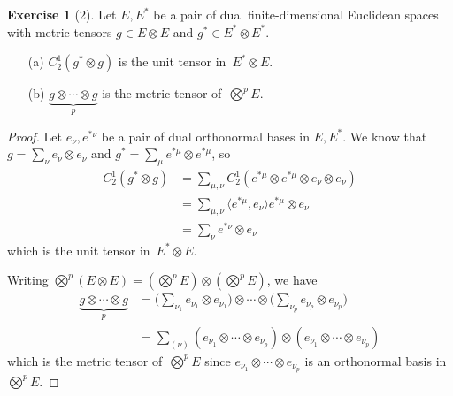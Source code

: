 \documentclass[letterpaper,12pt]{article}
\newcommand{\tprod}{\otimes}
\newcommand{\bigtprod}{\bigotimes}
\newcommand{\medtprod}{{\textstyle\bigtprod}}
\newcommand{\sprod}[2]{\langle#1,#2\rangle}
\newcommand{\multi}[4]{#2_{#3}#1\cdots#1#2_{#4}}
\newcommand{\tprods}[3]{\multi{\tprod}{#1}{#2}{#3}}
\theoremstyle{definition}
\newtheorem*{exer}{Exercise}
\theoremstyle{remark}
\begin{document}
\begin{exer}[2]
Let \(E,E^*\) be a pair of dual finite-dimensional Euclidean spaces with metric tensors \(g\in E\tprod E\) and \(g^*\in E^*\tprod E^*\).
\begin{enumerate}
\item[(a)] \(C^1_2(g^*\tprod g)\) is the unit tensor in~\(E^*\tprod E\).
\item[(b)] \(\underbrace{g\tprod\cdots\tprod g}_p\) is the metric tensor of~\(\medtprod^p E\).
\end{enumerate}
\end{exer}
\begin{proof}
Let \(e_{\nu},e^{*\nu}\) be a pair of dual orthonormal bases in \(E,E^*\). We know that \(g=\sum_{\nu}e_{\nu}\tprod e_{\nu}\) and \(g^*=\sum_{\mu}e^{*\mu}\tprod e^{*\mu}\), so
\begin{align*}
C^1_2(g^*\tprod g)&=\sum_{\mu,\nu}C^1_2(e^{*\mu}\tprod e^{*\mu}\tprod e_{\nu}\tprod e_{\nu})\\
	&=\sum_{\mu,\nu}\sprod{e^{*\mu}}{e_{\nu}}e^{*\mu}\tprod e_{\nu}\\
	&=\sum_{\nu}e^{*\nu}\tprod e_{\nu}
\end{align*}
which is the unit tensor in~\(E^*\tprod E\).

Writing \(\medtprod^p(E\tprod E)=(\medtprod^p E)\tprod(\medtprod^p E)\), we have
\begin{align*}
\underbrace{g\tprod\cdots\tprod g}_p&=\bigl(\sum_{\nu_1}e_{\nu_1}\tprod e_{\nu_1}\bigr)\tprod\cdots\tprod\bigl(\sum_{\nu_p}e_{\nu_p}\tprod e_{\nu_p}\bigr)\\
	&=\sum_{(\nu)}(\tprods{e}{\nu_1}{\nu_p})\tprod(\tprods{e}{\nu_1}{\nu_p})
\end{align*}
which is the metric tensor of~\(\medtprod^p E\) since \(\tprods{e}{\nu_1}{\nu_p}\) is an orthonormal basis in~\(\medtprod^p E\).
\end{proof}
\end{document}
